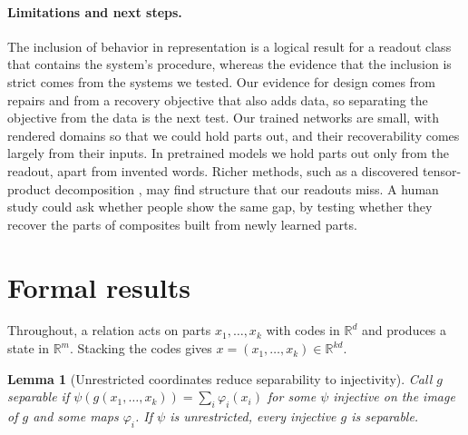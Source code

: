 \documentclass[10pt]{article}
\theoremstyle{plain}
\newtheorem{lemma}{Lemma}
\theoremstyle{remark}
\newcommand{\R}{\mathbb{R}}
\begin{document}
\paragraph{Limitations and next steps.} The inclusion of behavior in representation is a logical result for a readout class that contains the system's procedure, whereas the evidence that the inclusion is strict comes from the systems we tested. Our evidence for design comes from repairs and from a recovery objective that also adds data, so separating the objective from the data is the next test. Our trained networks are small, with rendered domains so that we could hold parts out, and their recoverability comes largely from their inputs. In pretrained models we hold parts out only from the readout, apart from invented words. Richer methods, such as a discovered tensor-product decomposition \citep{mccoy2019}, may find structure that our readouts miss. A human study could ask whether people show the same gap, by testing whether they recover the parts of composites built from newly learned parts.

\FloatBarrier



\clearpage
\appendix
\makeatletter\let\@fb@secFB\relax\makeatother %

\section{Formal results}
\label{app:proofs}

Throughout, a relation acts on parts $x_1, \ldots, x_k$ with codes in $\R^d$ and produces a state in $\R^m$. Stacking the codes gives $x = (x_1, \ldots, x_k) \in \R^{kd}$.



\begin{lemma}[Unrestricted coordinates reduce separability to injectivity]
\label{lem:psi}
Call $g$ separable if $\psi(g(x_1, \ldots, x_k)) = \sum_i \varphi_i(x_i)$ for some $\psi$ injective on the image of $g$ and some maps $\varphi_i$. If $\psi$ is unrestricted, every injective $g$ is separable.
\end{lemma}
\end{document}
